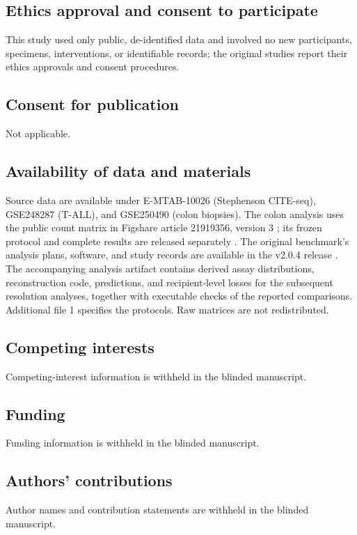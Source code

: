 \documentclass[pdflatex,sn-vancouver-num,iicol]{sn-jnl}
\begin{document}
\subsection*{Ethics approval and consent to participate}
This study used only public, de-identified data and involved no new participants, specimens, interventions, or identifiable records; the original studies report their ethics approvals and consent procedures.

\subsection*{Consent for publication}
Not applicable.

\subsection*{Availability of data and materials}
Source data are available under E-MTAB-10026 (Stephenson CITE-seq),
GSE248287 (T-ALL), and GSE250490 (colon biopsies). The colon analysis uses
the public count matrix in Figshare article 21919356, version 3
\cite{mennillo2024}; its frozen protocol and complete results are released
separately \cite{colontest2026}. The original benchmark's analysis plans,
software, and study records are available in the v2.0.4 release
\cite{benchmark2026}. The accompanying analysis artifact contains derived
assay distributions, reconstruction code, predictions, and recipient-level
losses for the subsequent resolution analyses, together with executable
checks of the reported comparisons. Additional file 1 specifies the protocols.
Raw matrices are not redistributed.

\subsection*{Competing interests}
Competing-interest information is withheld in the blinded manuscript.

\subsection*{Funding}
Funding information is withheld in the blinded manuscript.

\subsection*{Authors' contributions}
Author names and contribution statements are withheld in the blinded manuscript.
\end{document}
